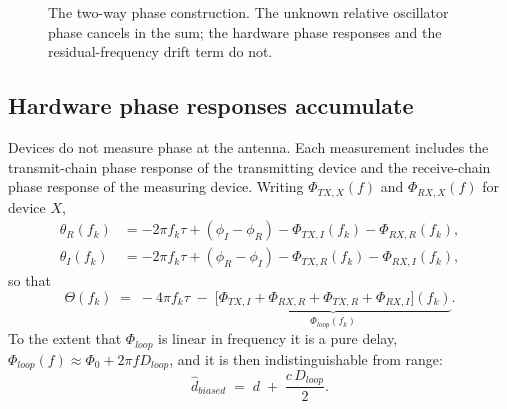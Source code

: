 \documentclass[11pt,a4paper]{article}
\begin{document}
\begin{figure}[h]
\centering
{}
\caption{The two-way phase construction. The unknown relative oscillator phase cancels in the sum;
the hardware phase responses and the residual-frequency drift term do not.}
\label{fig:cancel}
\end{figure}

\subsection{Hardware phase responses accumulate}
\label{sec:loopphase}

Devices do not measure phase at the antenna. Each measurement includes the transmit-chain phase
response of the transmitting device and the receive-chain phase response of the measuring device.
Writing $\Phi_{TX,X}(f)$ and $\Phi_{RX,X}(f)$ for device $X$,
\begin{align}
\theta_R(f_k) &= -2\pi f_k\tau + (\phi_I-\phi_R) - \Phi_{TX,I}(f_k) - \Phi_{RX,R}(f_k), \\
\theta_I(f_k) &= -2\pi f_k\tau + (\phi_R-\phi_I) - \Phi_{TX,R}(f_k) - \Phi_{RX,I}(f_k),
\end{align}
so that
\begin{equation}
\Theta(f_k) \;=\; -4\pi f_k \tau \;-\;
  \underbrace{\bigl[\Phi_{TX,I}+\Phi_{RX,R}+\Phi_{TX,R}+\Phi_{RX,I}\bigr](f_k)}_{\textstyle \Phi_{loop}(f_k)} .
\label{eq:loopphase}
\end{equation}
To the extent that $\Phi_{loop}$ is linear in frequency it is a pure delay,
$\Phi_{loop}(f) \approx \Phi_0 + 2\pi f D_{loop}$, and it is then indistinguishable from range:
\begin{equation}
\hat d_{biased} \;=\; d \;+\; \frac{c\,D_{loop}}{2} .
\label{eq:loopbias}
\end{equation}
\end{document}
